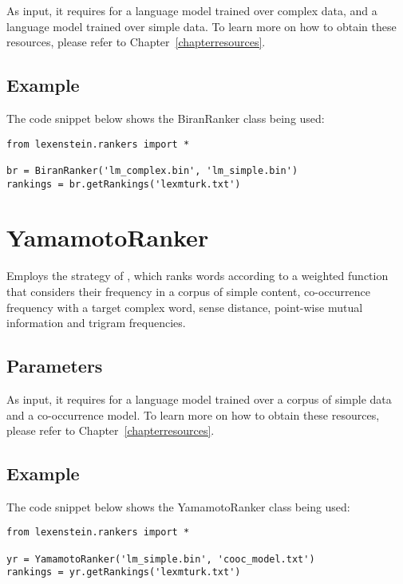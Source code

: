 As input, it requires for a language model trained over complex data, and a language model trained over simple data. To learn more on how to obtain these resources, please refer to Chapter~\ref{chapterresources}.

\subsection{Example}

The code snippet below shows the BiranRanker class being used:

\begin{lstlisting}
from lexenstein.rankers import *

br = BiranRanker('lm_complex.bin', 'lm_simple.bin')
rankings = br.getRankings('lexmturk.txt')
\end{lstlisting}















\section{YamamotoRanker}

Employs the strategy of \cite{Yamamoto2013}, which ranks words according to a weighted function that considers their frequency in a corpus of simple content, co-occurrence frequency with a target complex word, sense distance, point-wise mutual information and trigram frequencies.

\subsection{Parameters}

As input, it requires for a language model trained over a corpus of simple data and a co-occurrence model. To learn more on how to obtain these resources, please refer to Chapter~\ref{chapterresources}.

\subsection{Example}

The code snippet below shows the YamamotoRanker class being used:

\begin{lstlisting}
from lexenstein.rankers import *

yr = YamamotoRanker('lm_simple.bin', 'cooc_model.txt')
rankings = yr.getRankings('lexmturk.txt')
\end{lstlisting}















